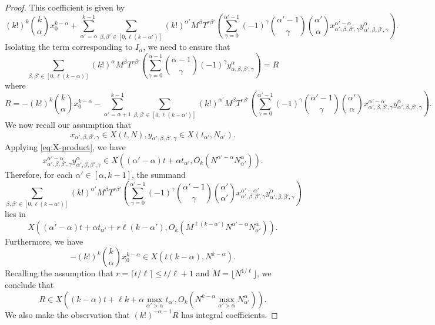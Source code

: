 \documentclass[12pt,reqno]{amsart}
\theoremstyle{plain}
\theoremstyle{definition}
\newcommand{\1}{\mathbf{1}}
\begin{document}
\begin{proof}
    This coefficient is given by
    $$(k!)^{k} \binom{k}{\alpha} x_0^{k - \alpha} + \sum_{\alpha' = \alpha}^{k - 1}\sum_{\beta, \beta' \in [0, \ell (k - \alpha')]}(k!)^{\alpha'} M^{\beta} T^{r \beta'} \left(\sum_{\gamma = 0}^{\alpha' - 1} (-1)^{\gamma} \binom{\alpha' - 1}{\gamma}  \binom{\alpha'}{\alpha}x_{\alpha', \beta, \beta', \gamma}^{\alpha' - \alpha} y_{\alpha', \beta, \beta', \gamma}^{\alpha} \right).$$
    Isolating the term corresponding to $I_{\alpha}$, we need to ensure that
    $$\sum_{\beta, \beta' \in [0, \ell (k - \alpha)]} (k!)^{\alpha} M^{\beta} T^{r \beta'} \left(\sum_{\gamma = 0}^{\alpha - 1} \binom{\alpha - 1}{\gamma} (-1)^{\gamma}  y_{\alpha, \beta, \beta', \gamma}^{\alpha}\right) = R$$
    where
    $$R = - (k!)^{k} \binom{k}{\alpha} x_0^{k - \alpha} - \sum_{\alpha' = \alpha + 1}^{k - 1}\sum_{\beta, \beta' \in [0, \ell (k - \alpha')]}(k!)^{\alpha'} M^{\beta} T^{r \beta'} \left(\sum_{\gamma = 0}^{\alpha' - 1} (-1)^{\gamma} \binom{\alpha' - 1}{\gamma}  \binom{\alpha'}{\alpha}x_{\alpha', \beta, \beta', \gamma}^{\alpha' - \alpha} y_{\alpha', \beta, \beta', \gamma}^{\alpha} \right).$$
    We now recall our assumption that
    $$x_{\alpha', \beta, \beta', \gamma} \in X(t, N), y_{\alpha', \beta, \beta', \gamma} \in X(t_{\alpha'}, N_{\alpha'}).$$
    Applying \eqref{eq:X-product}, we have
    $$x_{\alpha', \beta, \beta', \gamma}^{\alpha' - \alpha} y_{\alpha', \beta, \beta', \gamma}^{\alpha} \in X\left((\alpha' - \alpha) t + \alpha t_{\alpha'}, O_k\left(N^{\alpha' - \alpha} N_{\alpha'}^{\alpha}\right)\right).$$
    Therefore, for each $\alpha' \in [\alpha, k - 1]$, the summand
    $$\sum_{\beta, \beta' \in [0, \ell (k - \alpha')]}(k!)^{\alpha'} M^{\beta} T^{r \beta'} \left(\sum_{\gamma = 0}^{\alpha' - 1} (-1)^{\gamma} \binom{\alpha' - 1}{\gamma}  \binom{\alpha'}{\alpha'}x_{\alpha', \beta, \beta', \gamma}^{\alpha' - \alpha'} y_{\alpha', \beta, \beta', \gamma}^{\alpha} \right)$$
    lies in 
    $$X\left((\alpha' - \alpha) t + \alpha t_{\alpha'} + r \ell (k - \alpha'), O_k\left(M^{\ell (k - \alpha')}N^{\alpha' - \alpha} N_{\alpha'}^{\alpha}\right)\right).$$
    Furthermore, we have
    $$- (k!)^{k} \binom{k}{\alpha} x_0^{k - \alpha} \in X(t (k - \alpha), N^{k - \alpha}).$$
    Recalling the assumption that $r = \lceil {t / \ell} \rceil \leq t / \ell + 1$ and $M = \lfloor N^{1 / \ell} \rfloor$, we conclude that
    $$R \in X\left((k - \alpha) t + \ell k + \alpha \max_{\alpha' > \alpha} t_{\alpha'}, O_k\left(N^{k - \alpha} \max_{\alpha' > \alpha} N_{\alpha'}^{\alpha}\right)\right).$$
    We also make the observation that $(k!)^{-\alpha - 1} R$ has integral coefficients.
    

\end{proof}
\end{document}
